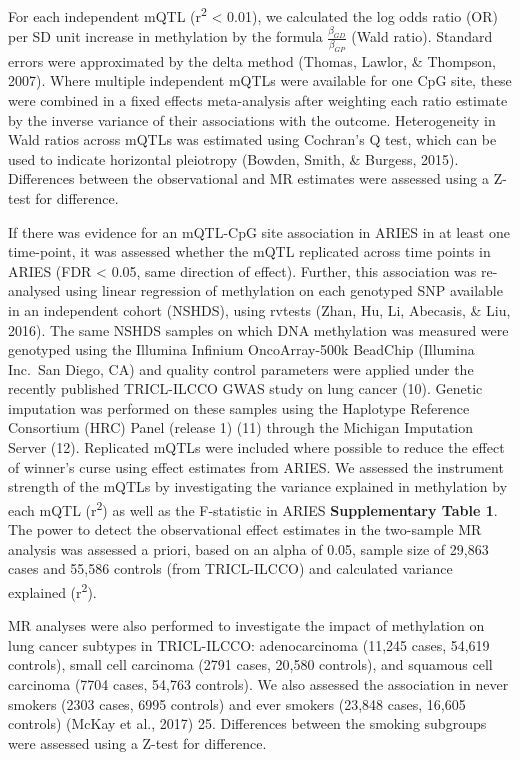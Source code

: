 \documentclass[11pt,twoside]{bristolthesis}
\begin{document}
For each independent mQTL (r\textsuperscript{2} \textless{} 0.01), we calculated the log odds ratio (OR) per SD unit increase in methylation by the formula \(\frac{\beta_{GD}} {\beta_{GP}}\) (Wald ratio). Standard errors were approximated by the delta method (Thomas, Lawlor, \& Thompson, 2007). Where multiple independent mQTLs were available for one CpG site, these were combined in a fixed effects meta-analysis after weighting each ratio estimate by the inverse variance of their associations with the outcome. Heterogeneity in Wald ratios across mQTLs was estimated using Cochran's Q test, which can be used to indicate horizontal pleiotropy (Bowden, Smith, \& Burgess, 2015). Differences between the observational and MR estimates were assessed using a Z-test for difference.

If there was evidence for an mQTL-CpG site association in ARIES in at least one time-point, it was assessed whether the mQTL replicated across time points in ARIES (FDR \textless{} 0.05, same direction of effect). Further, this association was re-analysed using linear regression of methylation on each genotyped SNP available in an independent cohort (NSHDS), using rvtests (Zhan, Hu, Li, Abecasis, \& Liu, 2016). The same NSHDS samples on which DNA methylation was measured were genotyped using the Illumina Infinium OncoArray-500k BeadChip (Illumina Inc.~San Diego, CA) and quality control parameters were applied under the recently published TRICL-ILCCO GWAS study on lung cancer (10). Genetic imputation was performed on these samples using the Haplotype Reference Consortium (HRC) Panel (release 1) (11) through the Michigan Imputation Server (12). Replicated mQTLs were included where possible to reduce the effect of winner's curse using effect estimates from ARIES. We assessed the instrument strength of the mQTLs by investigating the variance explained in methylation by each mQTL (r\textsuperscript{2}) as well as the F-statistic in ARIES \textbf{Supplementary Table 1}. The power to detect the observational effect estimates in the two-sample MR analysis was assessed a priori, based on an alpha of 0.05, sample size of 29,863 cases and 55,586 controls (from TRICL-ILCCO) and calculated variance explained (r\textsuperscript{2}).

MR analyses were also performed to investigate the impact of methylation on lung cancer subtypes in TRICL-ILCCO: adenocarcinoma (11,245 cases, 54,619 controls), small cell carcinoma (2791 cases, 20,580 controls), and squamous cell carcinoma (7704 cases, 54,763 controls). We also assessed the association in never smokers (2303 cases, 6995 controls) and ever smokers (23,848 cases, 16,605 controls) (McKay et al., 2017) 25. Differences between the smoking subgroups were assessed using a Z-test for difference.
\end{document}
